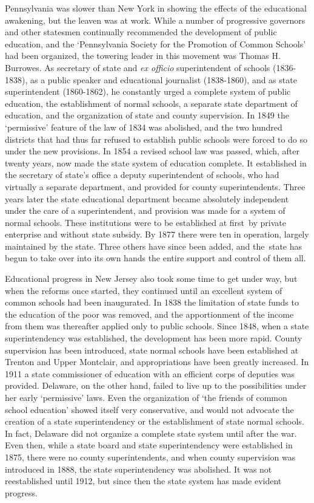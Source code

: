 \documentclass[]{book}
\begin{document}
Pennsylvania was slower than New York in showing the effects of the educational awakening, but the leaven was at work. While a number of progressive governors and other statesmen continually recommended the development of public education, and the `Pennsylvania Society for the Promotion of Common Schools' had been organized, the towering leader in this movement was Thomas H. Burrowes. As secretary of state and \emph{ex officio} superintendent of schools (1836-1838), as a public speaker and educational journalist (1838-1860), and as state superintendent (1860-1862), he constantly urged a complete system of public education, the establishment of normal schools, a separate state department of education, and the organization of state and county supervision. In 1849 the `permissive' feature of the law of 1834 was abolished, and the two hundred districts that had thus far refused to establish public schools were forced to do so under the new provisions. In 1854 a revised school law was passed, which, after twenty years, now made the state system of education complete. It established in the secretary of state's office a deputy superintendent of schools, who had virtually a separate department, and provided for county superintendents. Three years later the state educational department became absolutely independent under the care of a superintendent, and provision was made for a system of normal schools. These institutions were to be established at first~by private enterprise and without state subsidy. By 1877 there were ten in operation, largely maintained by the state. Three others have since been added, and the~state has begun to take over into its own hands the entire support and control of them all.

Educational progress in New Jersey also took some time to get under way, but when the reforms once started, they continued until an excellent system of common schools had been inaugurated. In 1838 the limitation of state funds to the education of the poor was removed, and the apportionment of the income from them was thereafter applied only to public schools. Since 1848, when a state superintendency was established, the development has been more rapid. County supervision has been introduced, state normal schools have been established at Trenton and Upper Montclair, and appropriations have been greatly increased. In 1911 a state commissioner of education with an efficient corps of deputies was provided. Delaware, on the other hand, failed to live up to the possibilities under her early `permissive' laws. Even the organization of `the friends of common school education' showed itself very conservative, and would not advocate the creation of a state superintendency or the establishment of state normal schools. In fact, Delaware did not organize a complete state system until after the war. Even then, while a state board and state superintendency were established in 1875, there were no county superintendents, and when county supervision was introduced in 1888, the state superintendency was abolished. It was not reestablished until 1912, but since then the state system has made evident progress.
\end{document}
